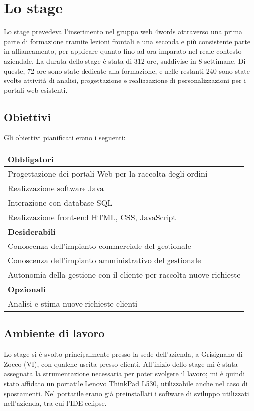\section{Lo stage}
Lo stage prevedeva l'inserimento nel gruppo web 4words attraverso una prima parte di formazione tramite lezioni frontali e una seconda e più consistente parte in affiancamento, per applicare quanto fino ad ora imparato nel reale contesto aziendale. La durata dello stage è stata di 312 ore, suddivise in 8 settimane. Di queste, 72 ore sono state dedicate alla formazione, e nelle restanti 240 sono state svolte attività di analisi, progettazione e realizzazione di personalizzazioni per i portali web esistenti.

\subsection{Obiettivi}
Gli obiettivi pianificati erano i seguenti:
\begin{table}[h]
	\centering
	\begin{tabular}{|l|}
		\hline
		\textbf{Obbligatori}\\
		\hline
		Progettazione dei portali Web per la raccolta degli ordini \\
		\hline
		Realizzazione software Java \\
		\hline
		Interazione con database SQL \\
		\hline
		Realizzazione front-end HTML, CSS, JavaScript \\
		\hline
		\textbf{Desiderabili}\\
		\hline
		Conoscenza dell'impianto commerciale del gestionale \\
		\hline
		Conoscenza dell'impianto amministrativo del gestionale \\
		\hline
		Autonomia della gestione con il cliente per raccolta nuove richieste \\
		\hline
		\textbf{Opzionali} \\
		\hline
		Analisi e stima nuove richieste clienti \\
		\hline
	\end{tabular}
	
\end{table}
\subsection{Ambiente di lavoro}
Lo stage si è svolto principalmente presso la sede dell'azienda, a Grisignano di Zocco (VI), con qualche uscita presso clienti. All'inizio dello stage mi è stata assegnata la strumentazione necessaria per poter svolgere il lavoro; mi è quindi stato affidato un portatile Lenovo ThinkPad L530, utilizzabile anche nel caso di spostamenti. Nel portatile erano già preinstallati i software di sviluppo utilizzati nell'azienda, tra cui l'\Gls{IDE} \Gls{eclipse}.


